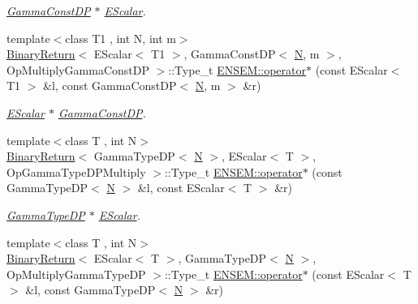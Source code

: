 \begin{DoxyCompactItemize}
\begin{DoxyCompactList}\small\item\em \mbox{\hyperlink{classENSEM_1_1GammaConstDP}{Gamma\+Const\+DP}} $\ast$ \mbox{\hyperlink{classENSEM_1_1EScalar}{E\+Scalar}}. \end{DoxyCompactList}\item 
{\footnotesize template$<$class T1 , int N, int m$>$ }\\\mbox{\hyperlink{structBinaryReturn}{Binary\+Return}}$<$ E\+Scalar$<$ T1 $>$, Gamma\+Const\+DP$<$ \mbox{\hyperlink{adat__devel_2lib_2hadron_2operator__name__util_8cc_a7722c8ecbb62d99aee7ce68b1752f337}{N}}, m $>$, Op\+Multiply\+Gamma\+Const\+DP $>$\+::Type\+\_\+t \mbox{\hyperlink{group__escalar_gaa60096d471282c83dab865d42b53ce96}{E\+N\+S\+E\+M\+::operator$\ast$}} (const E\+Scalar$<$ T1 $>$ \&l, const Gamma\+Const\+DP$<$ \mbox{\hyperlink{adat__devel_2lib_2hadron_2operator__name__util_8cc_a7722c8ecbb62d99aee7ce68b1752f337}{N}}, m $>$ \&r)
\begin{DoxyCompactList}\small\item\em \mbox{\hyperlink{classENSEM_1_1EScalar}{E\+Scalar}} $\ast$ \mbox{\hyperlink{classENSEM_1_1GammaConstDP}{Gamma\+Const\+DP}}. \end{DoxyCompactList}\item 
{\footnotesize template$<$class T , int N$>$ }\\\mbox{\hyperlink{structBinaryReturn}{Binary\+Return}}$<$ Gamma\+Type\+DP$<$ \mbox{\hyperlink{adat__devel_2lib_2hadron_2operator__name__util_8cc_a7722c8ecbb62d99aee7ce68b1752f337}{N}} $>$, E\+Scalar$<$ T $>$, Op\+Gamma\+Type\+D\+P\+Multiply $>$\+::Type\+\_\+t \mbox{\hyperlink{group__escalar_ga54ffca46c333d9dad30043eb6cef6299}{E\+N\+S\+E\+M\+::operator$\ast$}} (const Gamma\+Type\+DP$<$ \mbox{\hyperlink{adat__devel_2lib_2hadron_2operator__name__util_8cc_a7722c8ecbb62d99aee7ce68b1752f337}{N}} $>$ \&l, const E\+Scalar$<$ T $>$ \&r)
\begin{DoxyCompactList}\small\item\em \mbox{\hyperlink{classENSEM_1_1GammaTypeDP}{Gamma\+Type\+DP}} $\ast$ \mbox{\hyperlink{classENSEM_1_1EScalar}{E\+Scalar}}. \end{DoxyCompactList}\item 
{\footnotesize template$<$class T , int N$>$ }\\\mbox{\hyperlink{structBinaryReturn}{Binary\+Return}}$<$ E\+Scalar$<$ T $>$, Gamma\+Type\+DP$<$ \mbox{\hyperlink{adat__devel_2lib_2hadron_2operator__name__util_8cc_a7722c8ecbb62d99aee7ce68b1752f337}{N}} $>$, Op\+Multiply\+Gamma\+Type\+DP $>$\+::Type\+\_\+t \mbox{\hyperlink{group__escalar_ga546f1e55f2e4eda7a887fbf4fcaa177f}{E\+N\+S\+E\+M\+::operator$\ast$}} (const E\+Scalar$<$ T $>$ \&l, const Gamma\+Type\+DP$<$ \mbox{\hyperlink{adat__devel_2lib_2hadron_2operator__name__util_8cc_a7722c8ecbb62d99aee7ce68b1752f337}{N}} $>$ \&r)

\end{DoxyCompactItemize}
